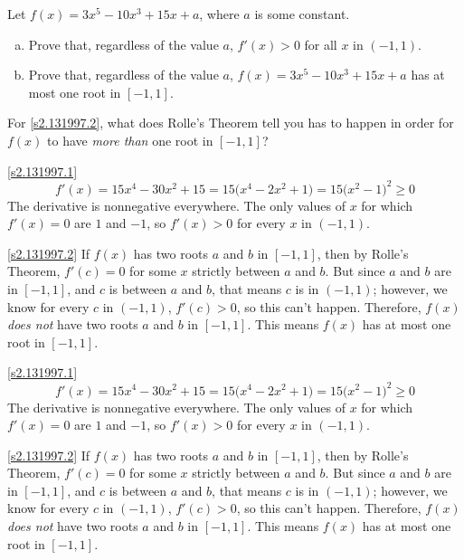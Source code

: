 \begin{Mquestion}[1997H]
Let $f(x)=3x^5-10x^3+15x+a$, where $a$ is some constant.
\begin{enumerate}[(a)]
\item\label{s2.131997.1}  Prove that, regardless of the value $a$, $f'(x)>0$
for all $x$ in $(-1,1)$.
\item\label{s2.131997.2} Prove that, regardless of the value $a$, $f(x)=3x^5-10x^3+15x+a$
has at most one root in $[-1,1]$.
\end{enumerate}
\end{Mquestion}
\begin{hint} For \eqref{s2.131997.2},  what does Rolle's Theorem tell you has to happen in order for $f(x)$ to have \emph{more than} one root in $[-1,1]$?
\end{hint}
\begin{answer}
\eqref{s2.131997.1} $$
f'(x)=15x^4-30x^2+15=15\big(x^4-2x^2+1\big)=15\big(x^2-1\big)^2\ge 0
$$
The derivative is nonnegative everywhere. The only values of $x$ for which $f'(x)=0$ are $1$ and $-1$, so $f'(x)>0$ for every $x$ in $(-1,1)$.
\smallskip

\eqref{s2.131997.2} If $f(x)$ has two roots $a$ and $b$ in $[-1,1]$, then by Rolle's Theorem, $f'(c)=0$ for some $x$ strictly between $a$ and $b$. But since $a$ and $b$ are in $[-1,1]$, and $c$ is between $a$ and $b$, that means $c$ is in $(-1,1)$; however, we know for every $c$ in $(-1,1)$, $f'(c)>0$, so this can't happen. Therefore, $f(x)$ \emph{does not} have two roots $a$ and $b$ in $[-1,1]$. This means $f(x)$ has at most one root in $[-1,1]$.

\end{answer}
\begin{solution}
\eqref{s2.131997.1} $$
f'(x)=15x^4-30x^2+15=15\big(x^4-2x^2+1\big)=15\big(x^2-1\big)^2\ge 0
$$
The derivative is nonnegative everywhere. The only values of $x$ for which $f'(x)=0$ are $1$ and $-1$, so $f'(x)>0$ for every $x$ in $(-1,1)$.
\smallskip

\eqref{s2.131997.2} If $f(x)$ has two roots $a$ and $b$ in $[-1,1]$, then by Rolle's Theorem, $f'(c)=0$ for some $x$ strictly between $a$ and $b$. But since $a$ and $b$ are in $[-1,1]$, and $c$ is between $a$ and $b$, that means $c$ is in $(-1,1)$; however, we know for every $c$ in $(-1,1)$, $f'(c)>0$, so this can't happen. Therefore, $f(x)$ \emph{does not} have two roots $a$ and $b$ in $[-1,1]$. This means $f(x)$ has at most one root in $[-1,1]$.
\end{solution}


